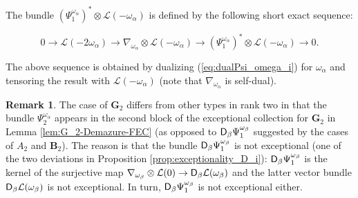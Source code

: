\documentclass[sn-mathphys-num]{sn-jnl}%
\newcommand{\Ll}{\mathcal L}
\newcommand{\bg}{\mathbf G}
\newcommand{\fb}{\mathbf B}
\theoremstyle{definition}
\newtheorem{remark}[theorem]{Remark}
\begin{document}
The bundle $(\Psi _1^{\omega _{\alpha}})^{\ast}\otimes \Ll (-\omega _{\alpha})$ is defined by the following short exact sequence:

\begin{equation}\label{eq:starstar}
0\rightarrow \Ll (-2\omega _{\alpha})\rightarrow \nabla _{\omega _{\alpha}}\otimes \Ll (-\omega _{\alpha})\rightarrow (\Psi _1^{\omega _{\alpha}})^{\ast}\otimes \Ll (-\omega _{\alpha})\rightarrow 0.
\end{equation}

The above sequence is obtained by dualizing (\ref{eq:dualPsi_omega_i}) for $\omega _{\alpha}$ and tensoring the result with $\Ll (-\omega _{\alpha})$ (note that $\nabla _{\omega _{\alpha}}$ is self-dual).

\begin{remark}
{The case of ${ \bg}_2$ differs from other types in rank two in that the bundle $\Psi _2^{\omega _{\alpha}}$ appears 
in the second block of the exceptional collection for ${ \bg}_2$ in Lemma \ref{lem:G_2-Demazure-FEC} (as opposed to ${\sf D}_{\beta}\Psi _1^{\omega _{\beta}}$ suggested by the cases of $A_2$ and ${\fb}_2$). The reason is that the bundle ${\sf D}_{\beta}\Psi _1^{\omega _{\beta}}$ is not exceptional (one of the two deviations in Proposition \ref{prop:exceptionality_D_i}): ${\sf D}_{\beta}\Psi _1^{\omega _{\beta}}$ is the kernel of the surjective map $\nabla _{\omega _{\beta}}\otimes \Ll (0)\rightarrow {\sf D}_{\beta}\Ll (\omega _{\beta})$ and the latter vector bundle ${\sf D}_{\beta}\Ll (\omega _{\beta})$ is not exceptional. In turn, ${\sf D}_{\beta}\Psi _1^{\omega _{\beta}}$ is not exceptional either.
}
\end{remark}
\end{document}
